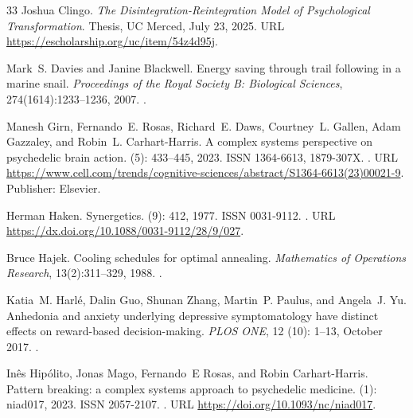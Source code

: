 \documentclass[12pt,fleqn]{article}
\begin{document}
\begin{thebibliography}{33}
  Joshua Clingo.
  \newblock \emph{The Disintegration-Reintegration Model of Psychological Transformation}.
  \newblock Thesis, UC Merced, July 23, 2025.
  \newblock URL \url{https://escholarship.org/uc/item/54z4d95j}.

  Mark~S. Davies and Janine Blackwell.
  \newblock Energy saving through trail following in a marine snail.
  \newblock \emph{Proceedings of the Royal Society B: Biological Sciences},
  274(1614):1233--1236, 2007.
  \newblock {}.

  Manesh Girn, Fernando~E. Rosas, Richard~E. Daws, Courtney~L. Gallen, Adam
  Gazzaley, and Robin~L. Carhart-Harris.
  \newblock A complex systems perspective on psychedelic brain action.
   (5): 433--445, 2023.
  \newblock ISSN 1364-6613, 1879-307X.
  \newblock {}.
  \newblock URL
  \url{https://www.cell.com/trends/cognitive-sciences/abstract/S1364-6613(23)00021-9}.
  \newblock Publisher: Elsevier.

  Herman Haken.
  \newblock Synergetics.
   (9): 412, 1977.
  \newblock ISSN 0031-9112.
  \newblock {}.
  \newblock URL \url{https://dx.doi.org/10.1088/0031-9112/28/9/027}.

  Bruce Hajek.
  \newblock Cooling schedules for optimal annealing.
  \newblock \emph{Mathematics of Operations Research}, 13(2):311--329, 1988.
  \newblock {}.

  Katia~M. Harl{\'e}, Dalin Guo, Shunan Zhang, Martin~P. Paulus, and Angela~J.
  Yu.
  \newblock Anhedonia and anxiety underlying depressive symptomatology have
  distinct effects on reward-based decision-making.
  \newblock \emph{PLOS ONE}, 12 (10): 1--13, October 2017.
  \newblock {}.

  In\^es Hip\'olito, Jonas Mago, Fernando~E Rosas, and Robin Carhart-Harris.
  \newblock Pattern breaking: a complex systems approach to psychedelic medicine.
   (1): niad017, 2023.
  \newblock ISSN 2057-2107.
  \newblock {}.
  \newblock URL \url{https://doi.org/10.1093/nc/niad017}.


\end{thebibliography}
\end{document}
